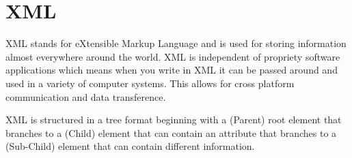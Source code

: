 
\section{XML}
XML stands for eXtensible Markup Language and is used for storing information almost everywhere around the world. XML is independent of propriety software applications which means when you write in XML it can be passed around and used in a variety of computer systems. This allows for cross platform communication and data transference.\newline

XML is structured in a tree format beginning with a (Parent) root element that branches to a (Child) element that can contain an attribute that branches to a (Sub-Child) element that can contain different information.\newline 




